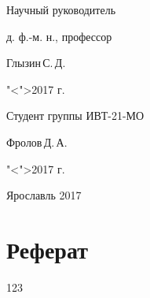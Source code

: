 \documentclass[a4paper, 14pt]{extarticle}
\theoremstyle{definition}
\begin{document}
{\medskip

\begin{flushright}
	Научный руководитель\par
	д. ф.-м. н., профессор\par
	\underline{\hspace{3.5cm}}Глызин\,С.\,Д.\par
	"<\underline{\hspace{0.8cm}}">\underline{\hspace{3.5cm}}2017 г.\par
\end{flushright}

\bigskip 

\begin{flushright}
	Студент группы ИВТ-21-МО\par
	\underline{\hspace{2.5cm}}Фролов\,Д.\,А.\par
	"<\underline{\hspace{0.8cm}}">\underline{\hspace{3.5cm}}2017 г.\par
\end{flushright}

\vspace{\fill}

\begin{center}
	Ярославль 2017
\end{center}

\clearpage
}



\section*{Реферат}
123
%
%
%
%
%
\end{document}
